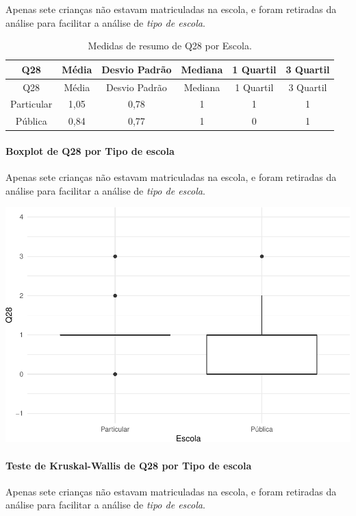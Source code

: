 \documentclass[]{article}
\let\oldparagraph\paragraph
\renewcommand{\paragraph}[1]{\oldparagraph{#1}\mbox{}}
\begin{document}
Apenas sete crianças não estavam matriculadas na escola, e foram retiradas da análise para facilitar a análise de \emph{tipo de escola}.

\begin{longtable}[]{@{}cccccc@{}}
\caption{\label{tab:unnamed-chunk-882}Medidas de resumo de Q28 por Escola.}\tabularnewline
\toprule
Q28 & Média & Desvio Padrão & Mediana & 1 Quartil & 3 Quartil\tabularnewline
\midrule
\endfirsthead
\toprule
Q28 & Média & Desvio Padrão & Mediana & 1 Quartil & 3 Quartil\tabularnewline
\midrule
\endhead
Particular & 1,05 & 0,78 & 1 & 1 & 1\tabularnewline
Pública & 0,84 & 0,77 & 1 & 0 & 1\tabularnewline
\bottomrule
\end{longtable}

\hypertarget{boxplot-de-q28-por-tipo-de-escola}{%
\paragraph{Boxplot de Q28 por Tipo de escola}\label{boxplot-de-q28-por-tipo-de-escola}}

Apenas sete crianças não estavam matriculadas na escola, e foram retiradas da análise para facilitar a análise de \emph{tipo de escola}.

\begin{center}\includegraphics[width=0.75\linewidth]{relatorio_covid19_files/figure-latex/unnamed-chunk-883-1} \end{center}

\hypertarget{teste-de-kruskal-wallis-de-q28-por-tipo-de-escola}{%
\paragraph{Teste de Kruskal-Wallis de Q28 por Tipo de escola}\label{teste-de-kruskal-wallis-de-q28-por-tipo-de-escola}}

Apenas sete crianças não estavam matriculadas na escola, e foram retiradas da análise para facilitar a análise de \emph{tipo de escola}.
\end{document}
